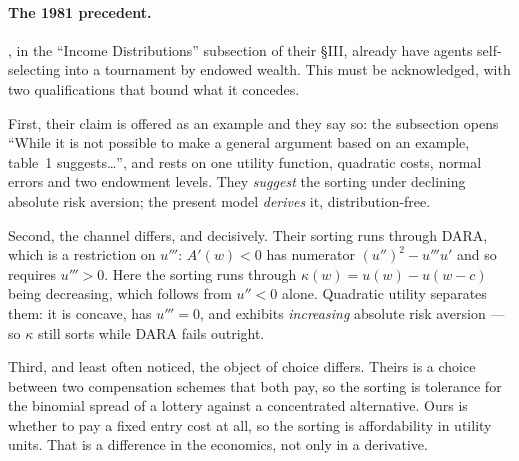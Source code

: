 \documentclass[11pt]{article}
\begin{document}
\paragraph{The 1981 precedent.} \citet{LazearRosen1981}, in the ``Income
Distributions'' subsection of their \S III, already have agents self-selecting
into a tournament by endowed wealth. This must be acknowledged, with two
qualifications that bound what it concedes.

First, their claim is offered as an example and they say so: the subsection
opens ``While it is not possible to make a general argument based on an
example, table~1 suggests\ldots'', and rests on one utility function, quadratic
costs, normal errors and two endowment levels. They \emph{suggest} the sorting
under declining absolute risk aversion; the present model \emph{derives} it,
distribution-free.

Second, the channel differs, and decisively. Their sorting runs through DARA,
which is a restriction on $u'''$: $A'(w)<0$ has numerator $(u'')^2 - u'''u'$
and so requires $u'''>0$. Here the sorting runs through $\kappa(w) =
u(w)-u(w-c)$ being decreasing, which follows from $u''<0$ alone. Quadratic
utility separates them: it is concave, has $u'''=0$, and exhibits
\emph{increasing} absolute risk aversion --- so $\kappa$ still sorts while DARA
fails outright.

Third, and least often noticed, the object of choice differs. Theirs is a
choice between two compensation schemes that both pay, so the sorting is
tolerance for the binomial spread of a lottery against a concentrated
alternative. Ours is whether to pay a fixed entry cost at all, so the sorting
is affordability in utility units. That is a difference in the economics, not
only in a derivative.
\end{document}
